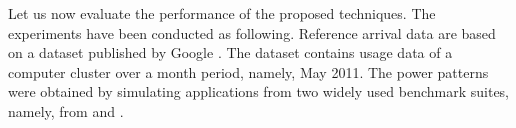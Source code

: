 Let us now evaluate the performance of the proposed techniques. The experiments
have been conducted as following. Reference arrival data are based on a dataset
published by Google \cite{google}. The dataset contains usage data of a computer
cluster over a month period, namely, May 2011. The power patterns were obtained
by simulating applications from two widely used benchmark suites, namely, from
 \cite{bienia2011} and  \cite{cpu2006}.
